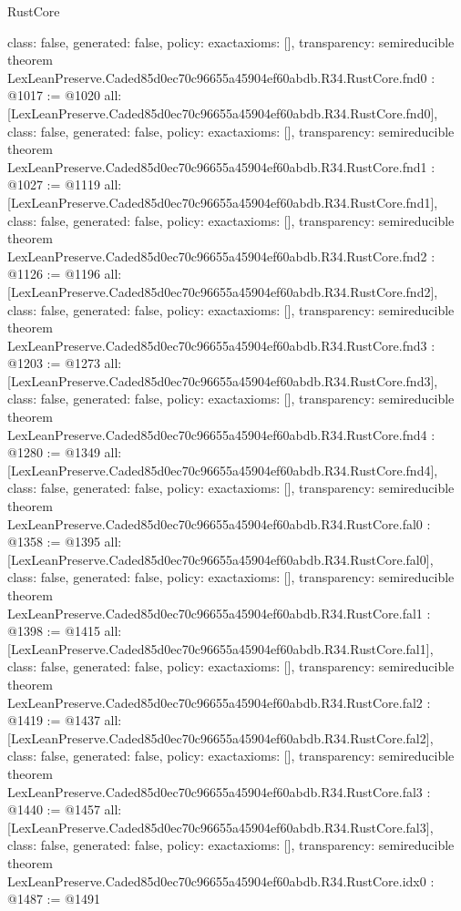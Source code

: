 \begin{lexlean}{RustCore}
\begin{coremodule}
{  class: false,
  generated: false,
  policy: exact{axioms: []},
  transparency: semireducible
}
theorem LexLeanPreserve.Caded85d0ec70c96655a45904ef60abdb.R34.RustCore.fnd0 : @1017 := @1020 {
  all: [LexLeanPreserve.Caded85d0ec70c96655a45904ef60abdb.R34.RustCore.fnd0],
  class: false,
  generated: false,
  policy: exact{axioms: []},
  transparency: semireducible
}
theorem LexLeanPreserve.Caded85d0ec70c96655a45904ef60abdb.R34.RustCore.fnd1 : @1027 := @1119 {
  all: [LexLeanPreserve.Caded85d0ec70c96655a45904ef60abdb.R34.RustCore.fnd1],
  class: false,
  generated: false,
  policy: exact{axioms: []},
  transparency: semireducible
}
theorem LexLeanPreserve.Caded85d0ec70c96655a45904ef60abdb.R34.RustCore.fnd2 : @1126 := @1196 {
  all: [LexLeanPreserve.Caded85d0ec70c96655a45904ef60abdb.R34.RustCore.fnd2],
  class: false,
  generated: false,
  policy: exact{axioms: []},
  transparency: semireducible
}
theorem LexLeanPreserve.Caded85d0ec70c96655a45904ef60abdb.R34.RustCore.fnd3 : @1203 := @1273 {
  all: [LexLeanPreserve.Caded85d0ec70c96655a45904ef60abdb.R34.RustCore.fnd3],
  class: false,
  generated: false,
  policy: exact{axioms: []},
  transparency: semireducible
}
theorem LexLeanPreserve.Caded85d0ec70c96655a45904ef60abdb.R34.RustCore.fnd4 : @1280 := @1349 {
  all: [LexLeanPreserve.Caded85d0ec70c96655a45904ef60abdb.R34.RustCore.fnd4],
  class: false,
  generated: false,
  policy: exact{axioms: []},
  transparency: semireducible
}
theorem LexLeanPreserve.Caded85d0ec70c96655a45904ef60abdb.R34.RustCore.fal0 : @1358 := @1395 {
  all: [LexLeanPreserve.Caded85d0ec70c96655a45904ef60abdb.R34.RustCore.fal0],
  class: false,
  generated: false,
  policy: exact{axioms: []},
  transparency: semireducible
}
theorem LexLeanPreserve.Caded85d0ec70c96655a45904ef60abdb.R34.RustCore.fal1 : @1398 := @1415 {
  all: [LexLeanPreserve.Caded85d0ec70c96655a45904ef60abdb.R34.RustCore.fal1],
  class: false,
  generated: false,
  policy: exact{axioms: []},
  transparency: semireducible
}
theorem LexLeanPreserve.Caded85d0ec70c96655a45904ef60abdb.R34.RustCore.fal2 : @1419 := @1437 {
  all: [LexLeanPreserve.Caded85d0ec70c96655a45904ef60abdb.R34.RustCore.fal2],
  class: false,
  generated: false,
  policy: exact{axioms: []},
  transparency: semireducible
}
theorem LexLeanPreserve.Caded85d0ec70c96655a45904ef60abdb.R34.RustCore.fal3 : @1440 := @1457 {
  all: [LexLeanPreserve.Caded85d0ec70c96655a45904ef60abdb.R34.RustCore.fal3],
  class: false,
  generated: false,
  policy: exact{axioms: []},
  transparency: semireducible
}
theorem LexLeanPreserve.Caded85d0ec70c96655a45904ef60abdb.R34.RustCore.idx0 : @1487 := @1491 {
}
\end{coremodule}
\end{lexlean}
